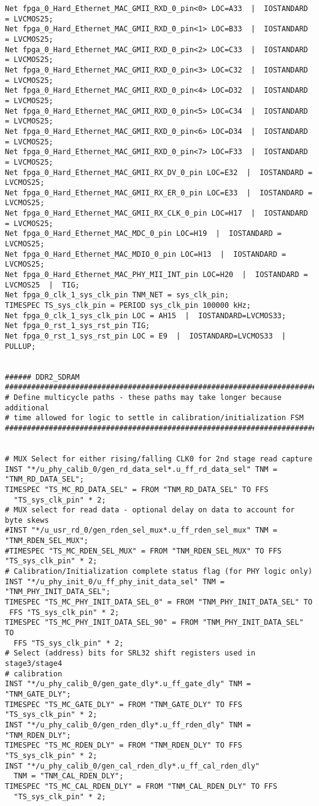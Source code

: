 \begin{verbatim}
Net fpga_0_Hard_Ethernet_MAC_GMII_RXD_0_pin<0> LOC=A33  |  IOSTANDARD = LVCMOS25;
Net fpga_0_Hard_Ethernet_MAC_GMII_RXD_0_pin<1> LOC=B33  |  IOSTANDARD = LVCMOS25;
Net fpga_0_Hard_Ethernet_MAC_GMII_RXD_0_pin<2> LOC=C33  |  IOSTANDARD = LVCMOS25;
Net fpga_0_Hard_Ethernet_MAC_GMII_RXD_0_pin<3> LOC=C32  |  IOSTANDARD = LVCMOS25;
Net fpga_0_Hard_Ethernet_MAC_GMII_RXD_0_pin<4> LOC=D32  |  IOSTANDARD = LVCMOS25;
Net fpga_0_Hard_Ethernet_MAC_GMII_RXD_0_pin<5> LOC=C34  |  IOSTANDARD = LVCMOS25;
Net fpga_0_Hard_Ethernet_MAC_GMII_RXD_0_pin<6> LOC=D34  |  IOSTANDARD = LVCMOS25;
Net fpga_0_Hard_Ethernet_MAC_GMII_RXD_0_pin<7> LOC=F33  |  IOSTANDARD = LVCMOS25;
Net fpga_0_Hard_Ethernet_MAC_GMII_RX_DV_0_pin LOC=E32  |  IOSTANDARD = LVCMOS25;
Net fpga_0_Hard_Ethernet_MAC_GMII_RX_ER_0_pin LOC=E33  |  IOSTANDARD = LVCMOS25;
Net fpga_0_Hard_Ethernet_MAC_GMII_RX_CLK_0_pin LOC=H17  |  IOSTANDARD = LVCMOS25;
Net fpga_0_Hard_Ethernet_MAC_MDC_0_pin LOC=H19  |  IOSTANDARD = LVCMOS25;
Net fpga_0_Hard_Ethernet_MAC_MDIO_0_pin LOC=H13  |  IOSTANDARD = LVCMOS25;
Net fpga_0_Hard_Ethernet_MAC_PHY_MII_INT_pin LOC=H20  |  IOSTANDARD = LVCMOS25  |  TIG;
Net fpga_0_clk_1_sys_clk_pin TNM_NET = sys_clk_pin;
TIMESPEC TS_sys_clk_pin = PERIOD sys_clk_pin 100000 kHz;
Net fpga_0_clk_1_sys_clk_pin LOC = AH15  |  IOSTANDARD=LVCMOS33;
Net fpga_0_rst_1_sys_rst_pin TIG;
Net fpga_0_rst_1_sys_rst_pin LOC = E9  |  IOSTANDARD=LVCMOS33  |  PULLUP;


###### DDR2_SDRAM
###############################################################################
# Define multicycle paths - these paths may take longer because additional
# time allowed for logic to settle in calibration/initialization FSM
###############################################################################


# MUX Select for either rising/falling CLK0 for 2nd stage read capture
INST "*/u_phy_calib_0/gen_rd_data_sel*.u_ff_rd_data_sel" TNM = "TNM_RD_DATA_SEL";
TIMESPEC "TS_MC_RD_DATA_SEL" = FROM "TNM_RD_DATA_SEL" TO FFS
  "TS_sys_clk_pin" * 2;
# MUX select for read data - optional delay on data to account for byte skews
#INST "*/u_usr_rd_0/gen_rden_sel_mux*.u_ff_rden_sel_mux" TNM = "TNM_RDEN_SEL_MUX";
#TIMESPEC "TS_MC_RDEN_SEL_MUX" = FROM "TNM_RDEN_SEL_MUX" TO FFS   "TS_sys_clk_pin" * 2;
# Calibration/Initialization complete status flag (for PHY logic only)
INST "*/u_phy_init_0/u_ff_phy_init_data_sel" TNM = "TNM_PHY_INIT_DATA_SEL";
TIMESPEC "TS_MC_PHY_INIT_DATA_SEL_0" = FROM "TNM_PHY_INIT_DATA_SEL" TO
 FFS "TS_sys_clk_pin" * 2;
TIMESPEC "TS_MC_PHY_INIT_DATA_SEL_90" = FROM "TNM_PHY_INIT_DATA_SEL" TO
  FFS "TS_sys_clk_pin" * 2;
# Select (address) bits for SRL32 shift registers used in stage3/stage4
# calibration
INST "*/u_phy_calib_0/gen_gate_dly*.u_ff_gate_dly" TNM = "TNM_GATE_DLY";
TIMESPEC "TS_MC_GATE_DLY" = FROM "TNM_GATE_DLY" TO FFS "TS_sys_clk_pin" * 2;
INST "*/u_phy_calib_0/gen_rden_dly*.u_ff_rden_dly" TNM = "TNM_RDEN_DLY";
TIMESPEC "TS_MC_RDEN_DLY" = FROM "TNM_RDEN_DLY" TO FFS "TS_sys_clk_pin" * 2;
INST "*/u_phy_calib_0/gen_cal_rden_dly*.u_ff_cal_rden_dly"
  TNM = "TNM_CAL_RDEN_DLY";
TIMESPEC "TS_MC_CAL_RDEN_DLY" = FROM "TNM_CAL_RDEN_DLY" TO FFS
  "TS_sys_clk_pin" * 2;


\end{verbatim}

